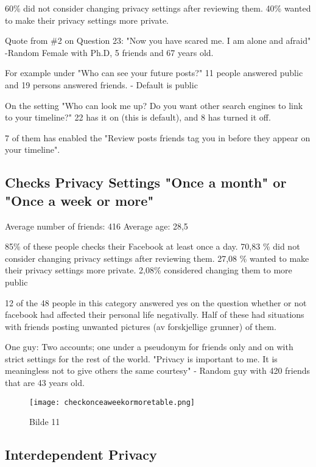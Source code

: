 60\% did not consider changing privacy settings after reviewing them. 
40\% wanted to make their privacy settings more private. 

Quote from \#2 on Question 23: "Now you have scared me. I am alone and afraid" -Random Female with Ph.D, 5 friends and 67 years old. 

For example under "Who can see your future posts?" 11 people answered public and 19 persons answered friends.
- Default is public

On the setting "Who can look me up? Do you want other search engines to link to your timeline?" 22 has it on (this is default), and 8 has turned it off. 

7 of them has enabled the "Review posts friends tag you in before they appear on your timeline". 

\subsection{Checks Privacy Settings "Once a month" or "Once a week or more"}
Average number of friends: 416
Average age: 28,5

85\% of these people checks their Facebook at least once a day.
70,83 \% did not consider changing privacy settings after reviewing them. 
27,08 \% wanted to make their privacy settings more private.
2,08\% considered changing them to more public 

12 of the 48 people in this category answered yes on the question whether or not facebook had affected their personal life negativally. Half of these had situations with friends posting unwanted pictures (av forskjellige grunner) of them.

One guy: Two accounts; one under a pseudonym for friends only and on with strict settings for the rest of the world. "Privacy is important to me. It is meaningless not to give others the same courtesy" - Random guy with 420 friends that are 43 years old. 

\begin{figure}[h!]
\centering
\texttt{[image: checkonceaweekormoretable.png]}
\caption[Bilde 1]{Bilde 11} 
\label{fig:co}
\end{figure}

\subsection{Interdependent Privacy}


